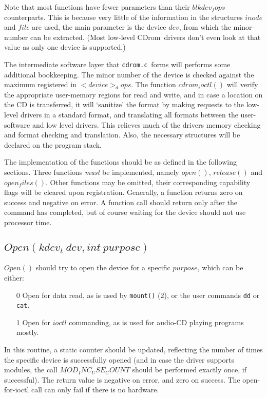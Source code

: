 \documentclass{article}
\def\cdrom{{\sc CDrom}}
\def\cdromc{{\tt cdrom.c}}
\begin{document}
Note that most functions have fewer parameters than their
$blkdev_fops$ counterparts. This is because very little of the
information in the structures $inode$ and $file$ are used, the main
parameter is the device $dev$, from which the minor-number can be
extracted. (Most low-level \cdrom\ drivers don't even look at that value
as only one device is supported.)

The intermediate software layer that \cdromc\ forms will performs some
additional bookkeeping. The minor number of the device is checked
against the maximum registered in $<device>_dops$. The function
$cdrom_ioctl()$ will verify the appropriate user-memory regions for
read and write, and in case a location on the CD is transferred, it
will `sanitize' the format by making requests to the low-level drivers
in a standard format, and translating all formats between the
user-software and low level drivers. This relieves much of the drivers
memory checking and format checking and translation. Also, the
necessary structures will be declared on the program stack.

The implementation of the functions should be as defined in the
following sections. Three functions {\em must\/} be implemented,
namely $open()$, $release()$ and $open_files()$. Other functions may
be omitted, their corresponding capability flags will be cleared upon
registration. Generally, a function returns zero on success and
negative on error. A function call should return only after the
command has completed, but of course waiting for the device should not
use processor time.

\subsection{$Open(kdev_t\ dev, int\ purpose)$}

$Open()$ should try to open the device for a specific $purpose$, which
can be either:
\begin{itemize}
\item[0] Open for data read, as is used by {\tt mount()} (2), or the
user commands {\tt dd} or {\tt cat}.  
\item[1] Open for $ioctl$ commanding, as is used for audio-CD playing
programs mostly. 
\end{itemize}
In this routine, a static counter should be updated, reflecting the
number of times the specific device is successfully opened (and in
case the driver supports modules, the call $MOD_INC_USE_COUNT$
should be performed exactly once, if successful). The return value is
negative on error, and zero on success. The open-for-ioctl call can
only fail if there is no hardware.
\end{document}
